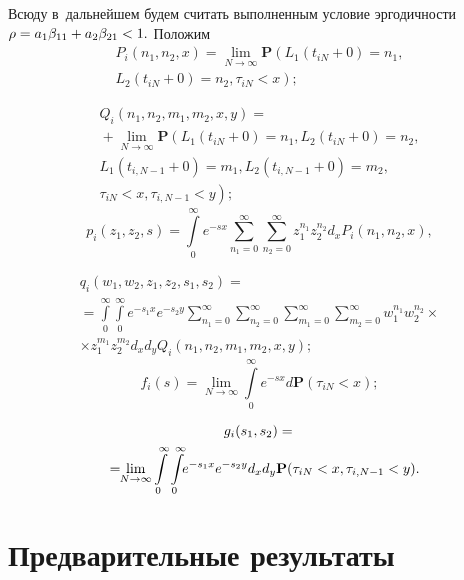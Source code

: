 \begin{multicols}{2}
Всюду в~дальнейшем будем считать выполненным условие эргодичности 
$\rho\hm=a_1\beta_{11}\hm+a_2\beta_{21}\hm<1.$
Положим
\begin{multline*}
P_i\left(n_1,n_2,x\right)=\lim\limits_{N\rightarrow\infty}
\mathbf{P}\left(L_1\left(t_{iN}+0\right)=n_1,\right.\\
\left.L_2
\left(t_{iN}+0\right)=n_2,\tau_{iN}<x\right);
\end{multline*}


\noindent
\begin{multline*}
Q_i\left(n_1,n_2,m_1,m_2,x,y\right)={}\\
{}+
\lim\limits_{N\rightarrow\infty}\mathbf{P}
\left(L_1(t_{iN}+0)=n_1,L_2(t_{iN}+0)=n_2,\right.\\
 L_1(t_{i,N-1}+0)=m_1,L_2(t_{i,N-1}+0)=m_2,\\
\left.\tau_{iN}<x,\tau_{i,N-1}<y\right);
\end{multline*}
$$
p_i\left(z_1,z_2,s\right)=\!
\int\limits_0^{\infty}\!\!e^{-sx}\sum\limits_{n_1=0}^{\infty}\sum\limits_{n_2=0}^{\infty}
z_1^{n_1}z_2^{n_2}d_xP_i\left(n_1,n_2,x\right),
$$

\vspace*{-12pt}

\noindent
\begin{multline*}
q_i\left(w_1,w_2,z_1,z_2,s_1,s_2\right)={}\\
{}=
\int\limits_0^{\infty}\int\limits_0^{\infty}e^{-s_1x}e^{-s_2y}
\sum\limits_{n_1=0}^{\infty}\sum\limits_{n_2=0}^{\infty}
\sum\limits_{m_1=0}^{\infty}\sum\limits_{m_2=0}^{\infty}w_1^{n_1}w_2^{n_2}\times
\\
\times
z_1^{m_1}z_2^{m_2}d_xd_yQ_i\left(n_1,n_2,m_1,m_2,x,y\right);
\end{multline*}
$$
f_i(s)=\lim\limits_{N\rightarrow\infty}
\int\limits_0^{\infty}e^{-sx}d\mathbf{P}(\tau_{iN}<x);
$$

\vspace*{-12pt}

\noindent
\begin{multline*}
g_i(s_1,s_2)={}\\
{}=\!\!\lim\limits_{N\rightarrow\infty}
\int\limits_0^{\infty}\int\limits_0^{\infty}\!\!e^{-s_1x}e^{-s_2y}d_xd_y
\mathbf{P}(\tau_{iN}<x,\tau_{i,N-1}<y).\hspace*{-3.5pt}
\end{multline*}

\section{Предварительные результаты}


\end{multicols}
